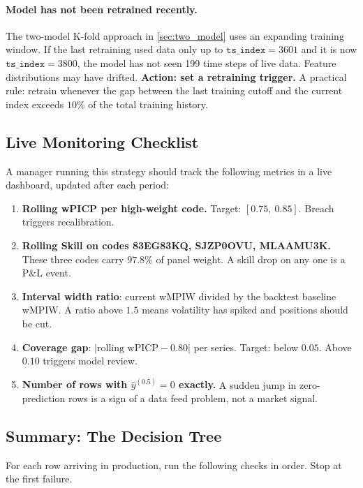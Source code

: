 \paragraph{Model has not been retrained recently.}
The two-model K-fold approach in \cref{sec:two_model} uses an expanding training window. If the last retraining used data only up to $\mathtt{ts\_index} = 3601$ and it is now $\mathtt{ts\_index} = 3800$, the model has not seen 199 time steps of live data. Feature distributions may have drifted. \textbf{Action: set a retraining trigger.} A practical rule: retrain whenever the gap between the last training cutoff and the current index exceeds $10\%$ of the total training history.

\subsection{Live Monitoring Checklist}

A manager running this strategy should track the following metrics in a live dashboard, updated after each period:

\begin{enumerate}
  \item \textbf{Rolling wPICP per high-weight code.} Target: $[0.75,\ 0.85]$. Breach triggers recalibration.
  \item \textbf{Rolling Skill on codes 83EG83KQ, SJZP0OVU, MLAAMU3K.} These three codes carry $97.8\%$ of panel weight. A skill drop on any one is a P\&L event.
  \item \textbf{Interval width ratio}: current wMPIW divided by the backtest baseline wMPIW. A ratio above $1.5$ means volatility has spiked and positions should be cut.
  \item \textbf{Coverage gap}: $|\text{rolling wPICP} - 0.80|$ per series. Target: below $0.05$. Above $0.10$ triggers model review.
  \item \textbf{Number of rows with $\hat{y}^{(0.5)} = 0$ exactly.} A sudden jump in zero-prediction rows is a sign of a data feed problem, not a market signal.
\end{enumerate}

\subsection{Summary: The Decision Tree}

For each row arriving in production, run the following checks in order. Stop at the first failure.

